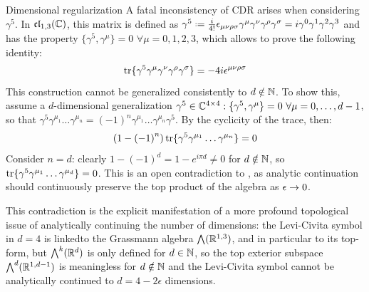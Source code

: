 \begin{observation}{Dimensional regularization}{}
  A fatal inconsistency of CDR arises when considering $ \gamma^5 $. In $ \mathfrak{cl}_{1,3}(\mathbb{C}) $, this matrix is defined as $ \gamma^5 \defeq \frac{i}{4!} \epsilon_{\mu \nu \rho \sigma} \gamma^\mu \gamma^\nu \gamma^\rho \gamma^\sigma = i \gamma^0 \gamma^1 \gamma^2 \gamma^3 $ and has the property $ \{\gamma^5 , \gamma^\mu\} = 0 \,\, \forall \mu = 0,1,2,3 $, which allows to prove the following identity:
  \begin{equation}
    \operatorname{tr}\{\gamma^5 \gamma^\mu \gamma^\nu \gamma^\rho \gamma^\sigma\} = -4 i \epsilon^{\mu \nu \rho \sigma}
    \label{eq:top-form-gamma-5}
  \end{equation}
  This construction cannot be generalized consistently to $ d \notin \mathbb{N} $. To show this, assume a $ d $-dimensional generalization $ \gamma^5 \in \mathbb{C}^{4 \times 4} : \{\gamma^5 , \gamma^\mu\} = 0 \,\,\forall \mu = 0, \dots, d-1 $, so that $ \gamma^5 \gamma^{\mu_1} \dots \gamma^{\mu_n} = \left( -1 \right)^n \gamma^{\mu_1} \dots \gamma^{\mu_n} \gamma^5 $. By the cyclicity of the trace, then:
  \begin{equation}
    \left( 1 - \left( -1 \right)^n \right) \operatorname{tr}\{\gamma^5 \gamma^{\mu_1} \dots \gamma^{\mu_n}\} = 0
  \end{equation}
  Consider $ n = d $: clearly $ 1 - \left( -1 \right)^d = 1 - e^{i \pi d} \neq 0 $ for $ d \notin \mathbb{N} $, so $ \operatorname{tr}\{\gamma^5 \gamma^{\mu_1} \dots \gamma^{\mu_d}\} = 0 $. This is an open contradiction to , as analytic continuation should continuously preserve the top product of the algebra as $ \epsilon \rightarrow 0 $.

  This contradiction is the explicit manifestation of a more profound topological issue of analytically continuing the number of dimensions: the Levi-Civita symbol in $ d = 4 $ is linked\footnotemark to the Grassmann algebra $ \bigwedge(\mathbb{R}^{1,3}) $, and in particular to its top-form, but $ \bigwedge^k(\mathbb{R}^d) $ is only defined for $ d \in \mathbb{N} $, so the top exterior subspace $ \bigwedge^d(\mathbb{R}^{1,d-1}) $ is meaningless for $ d \notin \mathbb{N} $ and the Levi-Civita symbol cannot be analytically continued to $ d = 4 - 2 \epsilon $ dimensions.
\end{observation}


